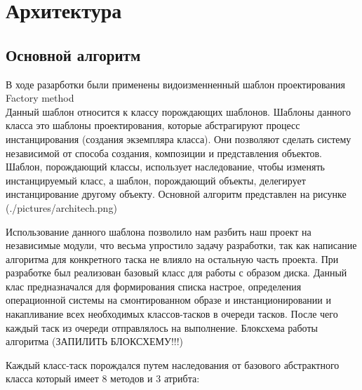 
\chapter{Архитектура}

\section{Основной алгоритм}
В ходе разарботки были применены видоизменненный шаблон проектирования Factory method\\

Данный шаблон относится к классу порождающих шаблонов. Шаблоны данного класса это шаблоны проектирования, которые абстрагируют процесс инстанцирования (создания экземпляра класса). Они позволяют сделать систему независимой от способа создания, композиции и представления объектов. Шаблон, порождающий классы, использует наследование, чтобы изменять инстанцируемый класс, а шаблон, порождающий объекты, делегирует инстанцирование другому объекту.
Основной алгоритм представлен на рисунке (./pictures/architech.png)

Использование данного шаблона позволило нам разбить наш проект на независимые модули, что весьма упростило задачу разработки, так как написание алгоритма для конкретного таска не влияло на остальную часть проекта. При разработке был реализован базовый класс для работы с образом диска. Данный клас предназначался для формирования списка настрое, определения операционной системы на смонтированном образе и инстанционировании и накапливание всех необходимых классов-тасков в очереди тасков. После чего каждый таск из очереди отправлялось на выполнение. Блоксхема работы алгоритма (ЗАПИЛИТЬ БЛОКСХЕМУ!!!)

Каждый класс-таск порождался путем наследования от базового абстрактного класса который имеет 8 методов и 3 атрибта:

